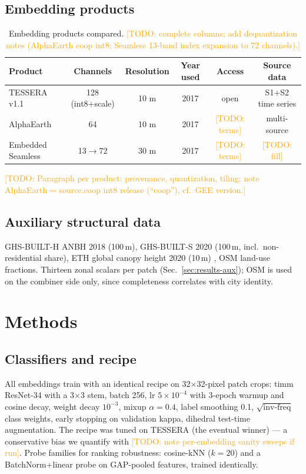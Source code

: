 \documentclass[11pt]{article}
\newcommand{\todo}[1]{\textcolor{orange}{[TODO: #1]}}
\begin{document}
\subsection{Embedding products}
\begin{table}[h]
\centering\small
\begin{tabular}{lccccc}
\toprule
Product & Channels & Resolution & Year used & Access & Source data\\
\midrule
TESSERA v1.1 & 128 (int8+scale) & 10 m & 2017 & open & S1+S2 time series\\
AlphaEarth & 64 & 10 m & 2017 & \todo{terms} & multi-source\\
Embedded Seamless & 13$\to$72 & 30 m & 2017 & \todo{terms} & \todo{fill}\\
\bottomrule
\end{tabular}
\caption{Embedding products compared. \todo{complete columns; add
dequantization notes (AlphaEarth coop int8; Seamless 13-band index
expansion to 72 channels).}}
\label{tab:embeddings}
\end{table}

\todo{Paragraph per product: provenance, quantization, tiling; note
AlphaEarth = source.coop int8 release (``coop''), cf.\ GEE version.}

\subsection{Auxiliary structural data}
GHS-BUILT-H ANBH 2018 (100\,m), GHS-BUILT-S 2020 (100\,m, incl.\
non-residential share), ETH global canopy height 2020 (10\,m)
\citep{lang2023canopy}, OSM land-use fractions. Thirteen zonal
scalars per patch (Sec.~\ref{sec:results-aux}); OSM is used on the
combiner side only, since completeness correlates with city identity.

\section{Methods}\label{sec:methods}

\subsection{Classifiers and recipe}\label{sec:methods-recipe}
All embeddings train with an identical recipe on 32$\times$32-pixel
patch crops: timm ResNet-34 with a 3$\times$3 stem, batch 256, lr
$5{\times}10^{-4}$ with 3-epoch warmup and cosine decay, weight decay
$10^{-3}$, mixup $\alpha{=}0.4$, label smoothing 0.1,
$\sqrt{\text{inv-freq}}$ class weights, early stopping on validation
kappa, dihedral test-time augmentation. The recipe was tuned on
TESSERA (the eventual winner) --- a conservative bias we quantify
with \todo{note per-embedding sanity sweeps if run}. Probe families
for ranking robustness: cosine-kNN ($k{=}20$) and a BatchNorm+linear
probe on GAP-pooled features, trained identically.
\end{document}
